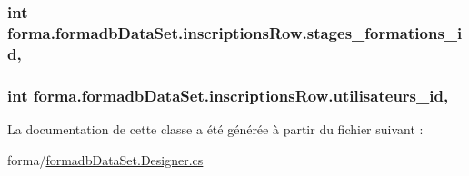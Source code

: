 \subsubsection[{\texorpdfstring{stages\+\_\+formations\+\_\+id}{stages_formations_id}}]{\setlength{\rightskip}{0pt plus 5cm}int forma.\+formadb\+Data\+Set.\+inscriptions\+Row.\+stages\+\_\+formations\+\_\+id\hspace{0.3cm}{\ttfamily [get]}, {\ttfamily [set]}}\hypertarget{classforma_1_1formadb_data_set_1_1inscriptions_row_a56afb06280aa2b54cae82badfe498705}{}\label{classforma_1_1formadb_data_set_1_1inscriptions_row_a56afb06280aa2b54cae82badfe498705}
\subsubsection[{\texorpdfstring{utilisateurs\+\_\+id}{utilisateurs_id}}]{\setlength{\rightskip}{0pt plus 5cm}int forma.\+formadb\+Data\+Set.\+inscriptions\+Row.\+utilisateurs\+\_\+id\hspace{0.3cm}{\ttfamily [get]}, {\ttfamily [set]}}\hypertarget{classforma_1_1formadb_data_set_1_1inscriptions_row_a423fe4af1405653f9c59da6f92e4afcc}{}\label{classforma_1_1formadb_data_set_1_1inscriptions_row_a423fe4af1405653f9c59da6f92e4afcc}


La documentation de cette classe a été générée à partir du fichier suivant \+:\begin{DoxyCompactItemize}
\item 
forma/\hyperlink{formadb_data_set_8_designer_8cs}{formadb\+Data\+Set.\+Designer.\+cs}\end{DoxyCompactItemize}
